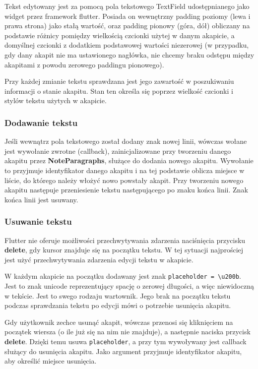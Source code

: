 Tekst edytowany jest za pomocą pola tekstowego TextField udostępnianego jako widget przez framework flutter. Posiada on wewnętrzny padding poziomy (lewa i prawa strona) jako stałą wartość, oraz padding pionowy (góra, dół) obliczany na podstawie różnicy pomiędzy wielkością czcionki użytej w danym akapicie, a domyślnej czcionki z dodatkiem podstawowej wartości niezerowej (w przypadku, gdy dany akapit nie ma ustawionego nagłówka, nie chcemy braku odstępu między akapitami z powodu zerowego paddingu pionowego).

Przy każdej zmianie tekstu sprawdzana jest jego zawartość w poszukiwaniu informacji o stanie akapitu. Stan ten określa się poprzez wielkość czcionki i stylów tekstu użytych w akapicie.

\subsubsection{Dodawanie tekstu}

Jeśli wewnątrz pola tekstowego został dodany znak nowej linii, wówczas wołane jest wywołanie zwrotne (callback), zainicjalizowane przy tworzeniu danego akapitu przez \textbf{NoteParagraphs}, służące do dodania nowego akapitu. Wywołanie to przyjmuje identyfikator danego akapitu i na tej podstawie oblicza miejsce w liście, do którego należy włożyć nowo powstały akapit. Przy tworzeniu nowego akapitu następuje przeniesienie tekstu następującego po znaku końca linii. Znak końca linii jest usuwany.

\subsubsection{Usuwanie tekstu}
\label{eq:usuwanieTekstu}

Flutter nie oferuje możliwości przechwytywania zdarzenia naciśnięcia przycisku \textbf{delete}, gdy kursor znajduje się na początku tekstu. W tej sytuacji najprościej jest użyć przechwytywania zdarzenia edycji tekstu w akapicie.

W każdym akapicie na początku dodawany jest znak \verb|placeholder = \u200b|. Jest to znak unicode reprezentujący spację o zerowej długości, a więc niewidoczną w tekście. Jest to swego rodzaju wartownik. Jego brak na początku tekstu podczas sprawdzania tekstu po edycji mówi o potrzebie usunięcia akapitu.

Gdy użytkownik zechce usunąć akapit, wówczas przenosi się kliknięciem na początek wiersza (o ile już się na nim nie znajduje), a następnie naciska przycisk \textbf{delete}. Dzięki temu usuwa \verb|placeholder|, a przy tym wywoływany jest callback służący do usunięcia akapitu. Jako argument przyjmuje identyfikator akapitu, aby określić miejsce usunięcia.

